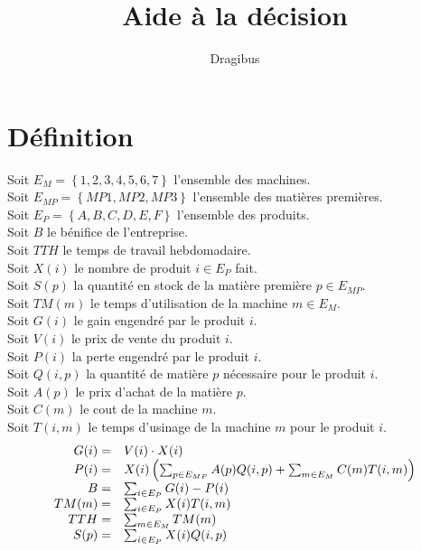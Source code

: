 \documentclass[a4paper, 11pt]{article}
\title{Aide à la décision}
\author{Dragibus}
\date{}
\begin{document}
\maketitle
\tableofcontents
\newpage

\section{Définition}
Soit $E_M = \left\{1, 2, 3, 4, 5, 6, 7\right\} $ l'ensemble des machines. \\
Soit $E_{MP} = \left\{MP1, MP2, MP3\right\} $ l'ensemble des matières premières. \\
Soit $E_P = \left\{A, B, C, D, E, F\right\} $ l'ensemble des produits. \\
Soit $B$ le bénifice de l'entreprise. \\
Soit $TTH$ le temps de travail hebdomadaire. \\
Soit $X(i)$ le nombre de produit $i\in E_P$ fait. \\
Soit $S(p)$ la quantité en stock de la matière première $p\in E_{MP}$. \\
Soit $TM(m)$ le temps d'utilisation de la machine $m\in E_M$.\\
Soit $G(i)$ le gain engendré par le produit $i$. \\
Soit $V(i)$ le prix de vente du produit $i$. \\
Soit $P(i)$ la perte engendré par le produit $i$. \\
Soit $Q(i, p)$ la quantité de matière $p$ nécessaire pour le produit $i$. \\
Soit $A(p)$ le prix d'achat de la matière $p$. \\
Soit $C(m)$ le cout de la machine $m$. \\
Soit $T(i, m)$ le temps d'usinage de la machine $m$ pour le produit $i$. \\

$$
\begin{array}{r l}
    G(i) =  & V(i)\cdot X(i) \\
    P(i) =  & X(i)\left(\sum_{p\in E_{MP}} A(p)Q(i, p)+ \sum_{m\in E_M} C(m)T(i, m)\right) \\
    B =     & \sum_{i\in E_P} G(i) - P(i) \\
    TM(m) = & \sum_{i\in E_P} X(i)T(i, m) \\
    TTH =   & \sum_{m\in E_M} TM(m) \\
    S(p) =  & \sum_{i\in E_P} X(i)Q(i, p) \\
\end{array}
$$
\end{document}
